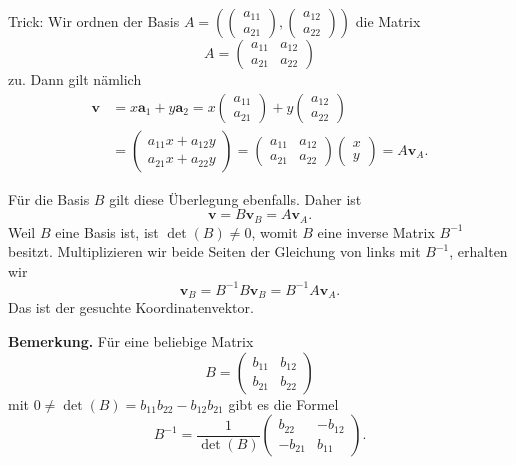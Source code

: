 \documentclass[9pt]{beamer}
\newcommand{\bv}[1]{\mathbf{#1}}
\newcommand{\strong}[1]{\textsf{\textbf{#1}}}
\begin{document}
\begin{frame}[t]
\vspace{4em}
Trick: Wir ordnen der Basis
$A=(\begin{pmatrix}a_{11}\\ a_{21}\end{pmatrix},
\begin{pmatrix}a_{12}\\ a_{22}\end{pmatrix})$
die Matrix
\[A=\begin{pmatrix}a_{11} & a_{12}\\ a_{21} & a_{22}\end{pmatrix}\]
zu.\pause{} Dann gilt nämlich
\begin{align*}
\bv v &= x\bv a_1 + y\bv a_2 = x\begin{pmatrix}a_{11}\\ a_{21}\end{pmatrix}
+ y\begin{pmatrix}a_{12}\\ a_{22}\end{pmatrix}\\
&= \begin{pmatrix}a_{11}x + a_{12}y\\ a_{21}x + a_{22}y\end{pmatrix}
= \begin{pmatrix}a_{11} & a_{12}\\ a_{21} & a_{22}\end{pmatrix}\begin{pmatrix}x\\ y\end{pmatrix}
= A\bv v_A.
\end{align*}
\end{frame}

\begin{frame}
Für die Basis $B$ gilt diese Überlegung ebenfalls. Daher ist
\[\bv v = B\bv v_B = A\bv v_A.\]\pause
Weil $B$ eine Basis ist, ist $\det(B)\ne 0$, womit $B$ eine
inverse Matrix $B^{-1}$ besitzt. Multiplizieren wir beide Seiten
der Gleichung von links mit $B^{-1}$, erhalten wir
\[\bv v_B = B^{-1}B\bv v_B = B^{-1}A\bv v_A.\]
Das ist der gesuchte Koordinatenvektor.
\end{frame}

\begin{frame}
\strong{Bemerkung.} Für eine beliebige Matrix
\[B = \begin{pmatrix}b_{11} & b_{12}\\ b_{21} & b_{22}\end{pmatrix}\]
mit $0\ne \det(B) = b_{11}b_{22}-b_{12}b_{21}$ gibt es die Formel
\[B^{-1} = \frac{1}{\det(B)}\begin{pmatrix}
 b_{22} & -b_{12}\\
-b_{21} &  b_{11}
\end{pmatrix}.\]
\end{frame}
\end{document}
